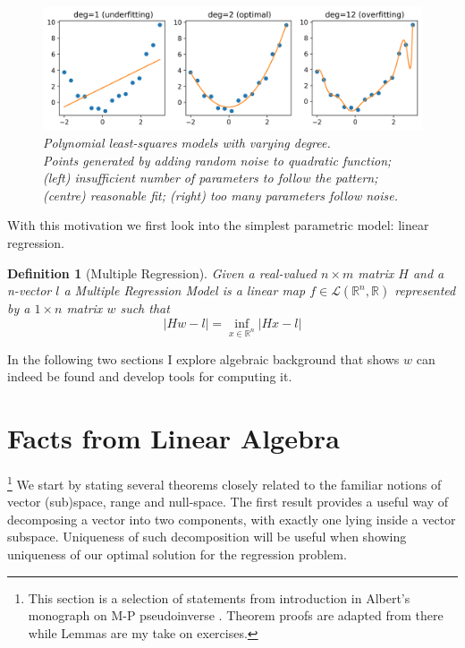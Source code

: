 \documentclass[a4paper,11pt]{article}
\theoremstyle{break}
\newtheorem{definition}{Definition}[section]
\newcommand{\R}{\mathbb{R}}
\begin{document}
\begin{figure}[b]
\centering
\captionsetup{width=0.8\linewidth}
\includegraphics[width=0.8\linewidth]{polyfit.png}
\caption[]{
    \textit{Polynomial least-squares models with varying degree. \\
    Points generated by adding random noise to quadratic function;
    (left) insufficient number of parameters to follow the pattern;
    (centre) reasonable fit;
    (right) too many parameters follow noise.}
}
\end{figure} 

With this motivation we first look into the simplest parametric model: linear regression.

\begin{definition}[Multiple Regression]
    Given a real-valued $ n \times m$ matrix $H$ and a n-vector $l$ a Multiple Regression Model is a linear map $f \in \mathcal{L} ( \R ^n, \R)$ represented by a $ 1 \times n$ matrix $w$ such that
    \begin{equation}\label{def2}
        | H w - l | = \inf\limits_{x \in \R^n} | H x - l |
    \end{equation}
\end{definition}

In the following two sections I explore algebraic background that shows $ w $ can indeed be found and develop tools for computing it.

\pagebreak
\section{Facts from Linear Algebra}

\footnote{This section is a selection of statements from introduction in Albert's monograph on M-P pseudoinverse \cite[pp6-12]{albert}. Theorem proofs are adapted from there while Lemmas are my take on exercises.}
%
We start by stating several theorems closely related to the familiar notions of vector (sub)space, range and null-space. The first result provides a useful way of decomposing a vector into two components, with exactly one lying inside a vector subspace. Uniqueness of such decomposition will be useful when showing uniqueness of our optimal solution for the regression problem.
\end{document}
